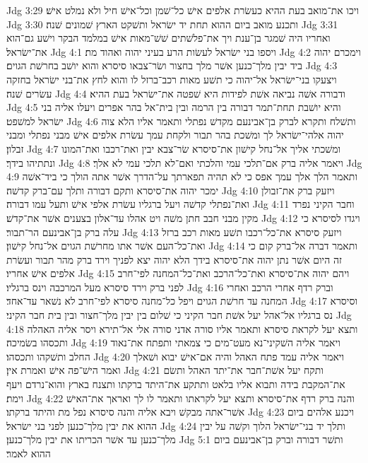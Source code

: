 Jdg 3:29  ויכו את־מואב בעת ההיא כעשׂרת אלפים אישׁ כל־שׁמן וכל־אישׁ חיל ולא נמלט אישׁ׃
Jdg 3:30  ותכנע מואב ביום ההוא תחת יד ישׂראל ותשׁקט הארץ שׁמונים שׁנה׃
Jdg 3:31  ואחריו היה שׁמגר בן־ענת ויך את־פלשׁתים שׁשׁ־מאות אישׁ במלמד הבקר וישׁע גם־הוא את־ישׂראל׃
Jdg 4:1  ויספו בני ישׂראל לעשׂות הרע בעיני יהוה ואהוד מת׃
Jdg 4:2  וימכרם יהוה ביד יבין מלך־כנען אשׁר מלך בחצור ושׂר־צבאו סיסרא והוא יושׁב בחרשׁת הגוים׃
Jdg 4:3  ויצעקו בני־ישׂראל אל־יהוה כי תשׁע מאות רכב־ברזל לו והוא לחץ את־בני ישׂראל בחזקה עשׂרים שׁנה׃
Jdg 4:4  ודבורה אשׁה נביאה אשׁת לפידות היא שׁפטה את־ישׂראל בעת ההיא׃
Jdg 4:5  והיא יושׁבת תחת־תמר דבורה בין הרמה ובין בית־אל בהר אפרים ויעלו אליה בני ישׂראל למשׁפט׃
Jdg 4:6  ותשׁלח ותקרא לברק בן־אבינעם מקדשׁ נפתלי ותאמר אליו הלא צוה יהוה אלהי־ישׂראל לך ומשׁכת בהר תבור ולקחת עמך עשׂרת אלפים אישׁ מבני נפתלי ומבני זבלון׃
Jdg 4:7  ומשׁכתי אליך אל־נחל קישׁון את־סיסרא שׂר־צבא יבין ואת־רכבו ואת־המונו ונתתיהו בידך׃
Jdg 4:8  ויאמר אליה ברק אם־תלכי עמי והלכתי ואם־לא תלכי עמי לא אלך׃
Jdg 4:9  ותאמר הלך אלך עמך אפס כי לא תהיה תפארתך על־הדרך אשׁר אתה הולך כי ביד־אשׁה ימכר יהוה את־סיסרא ותקם דבורה ותלך עם־ברק קדשׁה׃
Jdg 4:10  ויזעק ברק את־זבולן ואת־נפתלי קדשׁה ויעל ברגליו עשׂרת אלפי אישׁ ותעל עמו דבורה׃
Jdg 4:11  וחבר הקיני נפרד מקין מבני חבב חתן משׁה ויט אהלו עד־אלון בצענים אשׁר את־קדשׁ׃
Jdg 4:12  ויגדו לסיסרא כי עלה ברק בן־אבינעם הר־תבור׃
Jdg 4:13  ויזעק סיסרא את־כל־רכבו תשׁע מאות רכב ברזל ואת־כל־העם אשׁר אתו מחרשׁת הגוים אל־נחל קישׁון׃
Jdg 4:14  ותאמר דברה אל־ברק קום כי זה היום אשׁר נתן יהוה את־סיסרא בידך הלא יהוה יצא לפניך וירד ברק מהר תבור ועשׂרת אלפים אישׁ אחריו׃
Jdg 4:15  ויהם יהוה את־סיסרא ואת־כל־הרכב ואת־כל־המחנה לפי־חרב לפני ברק וירד סיסרא מעל המרכבה וינס ברגליו׃
Jdg 4:16  וברק רדף אחרי הרכב ואחרי המחנה עד חרשׁת הגוים ויפל כל־מחנה סיסרא לפי־חרב לא נשׁאר עד־אחד׃
Jdg 4:17  וסיסרא נס ברגליו אל־אהל יעל אשׁת חבר הקיני כי שׁלום בין יבין מלך־חצור ובין בית חבר הקיני׃
Jdg 4:18  ותצא יעל לקראת סיסרא ותאמר אליו סורה אדני סורה אלי אל־תירא ויסר אליה האהלה ותכסהו בשׂמיכה׃
Jdg 4:19  ויאמר אליה השׁקיני־נא מעט־מים כי צמאתי ותפתח את־נאוד החלב ותשׁקהו ותכסהו׃
Jdg 4:20  ויאמר אליה עמד פתח האהל והיה אם־אישׁ יבוא ושׁאלך ואמר הישׁ־פה אישׁ ואמרת אין׃
Jdg 4:21  ותקח יעל אשׁת־חבר את־יתד האהל ותשׂם את־המקבת בידה ותבוא אליו בלאט ותתקע את־היתד ברקתו ותצנח בארץ והוא־נרדם ויעף וימת׃
Jdg 4:22  והנה ברק רדף את־סיסרא ותצא יעל לקראתו ותאמר לו לך ואראך את־האישׁ אשׁר־אתה מבקשׁ ויבא אליה והנה סיסרא נפל מת והיתד ברקתו׃
Jdg 4:23  ויכנע אלהים ביום ההוא את יבין מלך־כנען לפני בני ישׂראל׃
Jdg 4:24  ותלך יד בני־ישׂראל הלוך וקשׁה על יבין מלך־כנען עד אשׁר הכריתו את יבין מלך־כנען׃
Jdg 5:1  ותשׁר דבורה וברק בן־אבינעם ביום ההוא לאמר׃
